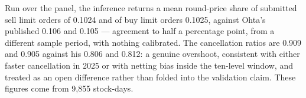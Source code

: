 Run over the panel, the inference returns a mean round-price share of submitted sell limit orders of 0.1024 and of buy limit orders 0.1025, against Ohta's published 0.106 and 0.105 --- agreement to half a percentage point, from a different sample period, with nothing calibrated. The cancellation ratios are 0.909 and 0.905 against his 0.806 and 0.812: a genuine overshoot, consistent with either faster cancellation in 2025 or with netting bias inside the ten-level window, and treated as an open difference rather than folded into the validation claim. These figures come from 9,855 stock-days.
